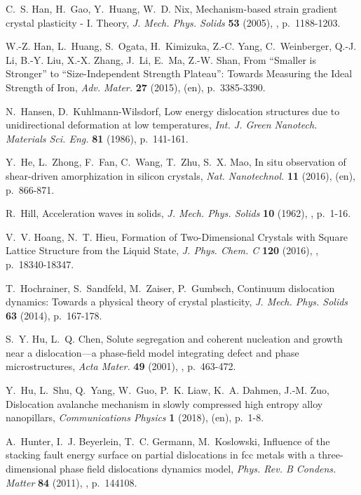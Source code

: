 \documentclass[CRPHYS,Unicode,manuscript]{cedram}
\begin{document}
\begin{thebibliography}{100}
C.~S. Han, H.~Gao, Y.~Huang, W.~D. Nix, {\og Mechanism-based strain gradient
  crystal plasticity - I. Theory\fg}, \emph{J. Mech. Phys. Solids} \textbf{53}
  (2005), , p.~1188-1203.

W.-Z. Han, L.~Huang, S.~Ogata, H.~Kimizuka, Z.-C. Yang, C.~Weinberger, Q.-J.
  Li, B.-Y. Liu, X.-X. Zhang, J.~Li, E.~Ma, Z.-W. Shan, {\og From ``Smaller is
  Stronger'' to ``{Size-Independent} Strength Plateau'': Towards Measuring the
  Ideal Strength of Iron\fg}, \emph{Adv. Mater.} \textbf{27} (2015),  (en), p.~3385-3390.

N.~Hansen, D.~Kuhlmann-Wilsdorf, {\og Low energy dislocation structures due to
  unidirectional deformation at low temperatures\fg}, \emph{Int. J. Green
  Nanotech. Materials Sci. Eng.} \textbf{81} (1986), p.~141-161.

Y.~He, L.~Zhong, F.~Fan, C.~Wang, T.~Zhu, S.~X. Mao, {\og In situ observation
  of shear-driven amorphization in silicon crystals\fg}, \emph{Nat.
  Nanotechnol.} \textbf{11} (2016),  (en), p.~866-871.

R.~Hill, {\og Acceleration waves in solids\fg}, \emph{J. Mech. Phys. Solids}
  \textbf{10} (1962), , p.~1-16.

V.~V. Hoang, N.~T. Hieu, {\og Formation of {Two-Dimensional} Crystals with
  Square Lattice Structure from the Liquid State\fg}, \emph{J. Phys. Chem. C}
  \textbf{120} (2016), , p.~18340-18347.

T.~Hochrainer, S.~Sandfeld, M.~Zaiser, P.~Gumbsch, {\og Continuum dislocation
  dynamics: Towards a physical theory of crystal plasticity\fg}, \emph{J. Mech.
  Phys. Solids} \textbf{63} (2014), p.~167-178.

S.~Y. Hu, L.~Q. Chen, {\og Solute segregation and coherent nucleation and
  growth near a dislocation---a phase-field model integrating defect and phase
  microstructures\fg}, \emph{Acta Mater.} \textbf{49} (2001), ,
  p.~463-472.

Y.~Hu, L.~Shu, Q.~Yang, W.~Guo, P.~K. Liaw, K.~A. Dahmen, J.-M. Zuo, {\og
  Dislocation avalanche mechanism in slowly compressed high entropy alloy
  nanopillars\fg}, \emph{Communications Physics} \textbf{1} (2018),  (en), p.~1-8.

A.~Hunter, I.~J. Beyerlein, T.~C. Germann, M.~Koslowski, {\og Influence of the
  stacking fault energy surface on partial dislocations in fcc metals with a
  three-dimensional phase field dislocations dynamics model\fg}, \emph{Phys.
  Rev. B Condens. Matter} \textbf{84} (2011), , p.~144108.


\end{thebibliography}
\end{document}
